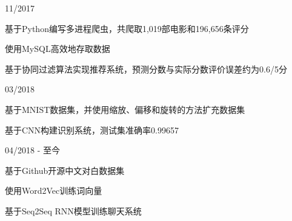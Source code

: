 
\begin{cventries}

\cvexperience
{}
{11/2017}
{
    \begin{cvitems}
    \item {基于Python编写多进程爬虫，共爬取1,019部电影和196,656条评分}
    \item {使用MySQL高效地存取数据}
    \item {基于协同过滤算法实现推荐系统，预测分数与实际分数评价误差约为0.6/5分}
    \end{cvitems}
}

\cvexperience
{}
{03/2018}
{
    \begin{cvitems}
    \item {基于MNIST数据集，并使用缩放、偏移和旋转的方法扩充数据集}
    \item {基于CNN构建识别系统，测试集准确率0.99657}
    \end{cvitems}
}

\cvexperience
{}
{04/2018 - 至今}
{
    \begin{cvitems}
    \item {基于Github开源中文对白数据集}
    \item {使用Word2Vec训练词向量}
    \item {基于Seq2Seq RNN模型训练聊天系统}
    \end{cvitems}
}

\end{cventries}